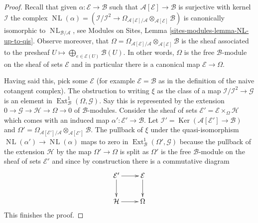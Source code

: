 \documentclass[10pt,a4paper]{amsart}
\theoremstyle{plain}
\theoremstyle{definition}
\theoremstyle{remark}
\numberwithin{equation}{subsection}
\def\Ext{\mathop{\mathrm{Ext}}\nolimits}
\def\NL{\mathop{N\!L}\nolimits}
\def\Ker{\mathop{\mathrm{Ker}}}
\begin{document}
\begin{proof}
Recall that given $\alpha : \mathcal{E} \to \mathcal{B}$
such that $\mathcal{A}[\mathcal{E}] \to \mathcal{B}$ is surjective
with kernel $\mathcal{I}$ the complex
$\NL(\alpha) = (\mathcal{I}/\mathcal{I}^2 \to 
\Omega_{\mathcal{A}[\mathcal{E}]/\mathcal{A}}
\otimes_{\mathcal{A}[\mathcal{E}]} \mathcal{B})$ is canonically
isomorphic to $\NL_{\mathcal{B}/\mathcal{A}}$, see
Modules on Sites, Lemma \ref{sites-modules-lemma-NL-up-to-qis}.
Observe moreover, that
$\Omega = \Omega_{\mathcal{A}[\mathcal{E}]/\mathcal{A}}
\otimes_{\mathcal{A}[\mathcal{E}]} \mathcal{B}$ is the sheaf
associated to the presheaf
$U \mapsto \bigoplus_{e \in \mathcal{E}(U)} \mathcal{B}(U)$.
In other words, $\Omega$ is the free $\mathcal{B}$-module on the
sheaf of sets $\mathcal{E}$ and in particular there is a canonical
map $\mathcal{E} \to \Omega$.

\medskip\noindent
Having said this, pick some $\mathcal{E}$ (for example
$\mathcal{E} = \mathcal{B}$ as in the definition of the naive cotangent
complex). The obstruction to writing $\xi$ as the class of a map
$\mathcal{I}/\mathcal{I}^2 \to \mathcal{G}$ is an element in
$\Ext^1_\mathcal{B}(\Omega, \mathcal{G})$. Say this is represented
by the extension $0 \to \mathcal{G} \to \mathcal{H} \to \Omega \to 0$
of $\mathcal{B}$-modules. Consider the sheaf of sets
$\mathcal{E}' = \mathcal{E} \times_\Omega \mathcal{H}$
which comes with an induced map $\alpha' : \mathcal{E}' \to \mathcal{B}$.
Let $\mathcal{I}' = \Ker(\mathcal{A}[\mathcal{E}'] \to \mathcal{B})$
and $\Omega' = \Omega_{\mathcal{A}[\mathcal{E}']/\mathcal{A}}
\otimes_{\mathcal{A}[\mathcal{E}']} \mathcal{B}$.
The pullback of $\xi$ under the quasi-isomorphism
$\NL(\alpha') \to \NL(\alpha)$ maps to zero in
$\Ext^1_\mathcal{B}(\Omega', \mathcal{G})$
because the pullback of the extension $\mathcal{H}$
by the map $\Omega' \to \Omega$ is split as $\Omega'$ is the free
$\mathcal{B}$-module on the sheaf of sets $\mathcal{E}'$ and since
by construction there is a commutative diagram
$$
\xymatrix{
\mathcal{E}' \ar[r] \ar[d] & \mathcal{E} \ar[d] \\
\mathcal{H} \ar[r] & \Omega
}
$$
This finishes the proof.
\end{proof}
\end{document}
